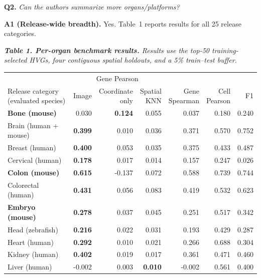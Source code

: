 \documentclass[10pt]{article}
\newcommand{\questionsep}{\par\vspace{0.75em}}
\begin{document}
\questionsep
\textbf{Q2.}\quad
\textit{Can the authors summarize more organs/platforms?}

\textbf{A1 (Release-wide breadth).}\enspace
Yes. Table~1 reports results for all 25 release categories.

\newpage
\begin{center}
\begingroup
\footnotesize
\setlength{\tabcolsep}{4.2pt}
\renewcommand{\arraystretch}{1.04}
\textit{\textbf{Table 1. Per-organ benchmark results.}
Results use the top-50 training-selected HVGs, four contiguous spatial
holdouts, and a 5\% train--test buffer.}\\[5pt]
\begin{tabular*}{\linewidth}{@{\extracolsep{\fill}}lrrrrrr@{}}
\toprule
& \multicolumn{3}{c}{Gene Pearson} & & & \\
\cmidrule(lr){2-4}
\shortstack[l]{Release category\\(evaluated species)} &
Image &
\shortstack{Coordinate\\only} &
\shortstack{Spatial\\KNN} &
\shortstack{Gene\\Spearman} &
\shortstack{Cell\\Pearson} &
F1 \\
\midrule
\textbf{Bone (mouse)} & 0.030 & \textbf{0.124} & 0.055 & 0.037 & 0.180 & 0.240 \\
Brain (human + mouse) & \textbf{0.399} & 0.010 & 0.036 & 0.371 & 0.570 & 0.752 \\
Breast (human) & \textbf{0.400} & 0.053 & 0.035 & 0.375 & 0.433 & 0.487 \\
Cervical (human) & \textbf{0.178} & 0.017 & 0.014 & 0.157 & 0.247 & 0.026 \\
\textbf{Colon (mouse)} & \textbf{0.615} & -0.137 & 0.072 & 0.588 & 0.739 & 0.744 \\
Colorectal (human) & \textbf{0.431} & 0.056 & 0.083 & 0.419 & 0.532 & 0.623 \\
\textbf{Embryo (mouse)} & \textbf{0.278} & 0.037 & 0.045 & 0.251 & 0.517 & 0.342 \\
Head (zebrafish) & \textbf{0.216} & 0.022 & 0.031 & 0.193 & 0.429 & 0.287 \\
Heart (human) & \textbf{0.292} & 0.010 & 0.021 & 0.266 & 0.688 & 0.304 \\
Kidney (human) & \textbf{0.402} & 0.019 & 0.017 & 0.361 & 0.471 & 0.460 \\
Liver (human) & -0.002 & 0.003 & \textbf{0.010} & -0.002 & 0.561 & 0.400 \\

\end{tabular*}
\end{center}
\end{document}

